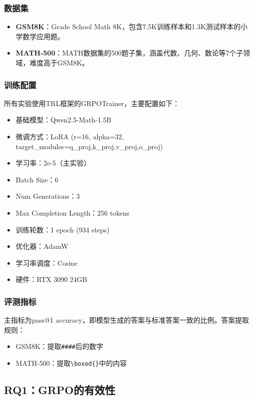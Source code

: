 \documentclass[10.5pt]{article}
\begin{document}
\subsubsection{数据集}

\begin{itemize}[leftmargin=2em]
  \item \textbf{GSM8K}\cite{gsm8k}：Grade School Math 8K，包含7.5K训练样本和1.3K测试样本的小学数学应用题。
  \item \textbf{MATH-500}：MATH数据集的500题子集，涵盖代数、几何、数论等7个子领域，难度高于GSM8K。
\end{itemize}

\subsubsection{训练配置}

所有实验使用TRL框架的GRPOTrainer，主要配置如下：

\begin{itemize}[leftmargin=2em]
  \item 基础模型：Qwen2.5-Math-1.5B
  \item 微调方式：LoRA (r=16, alpha=32, target\_modules=q\_proj,k\_proj,v\_proj,o\_proj)
  \item 学习率：2e-5（主实验）
  \item Batch Size：6
  \item Num Generations：3
  \item Max Completion Length：256 tokens
  \item 训练轮数：1 epoch (934 steps)
  \item 优化器：AdamW
  \item 学习率调度：Cosine
  \item 硬件：RTX 3090 24GB
\end{itemize}

\subsubsection{评测指标}

主指标为pass@1 accuracy，即模型生成的答案与标准答案一致的比例。答案提取规则：
\begin{itemize}[leftmargin=2em]
  \item GSM8K：提取\texttt{\#\#\#\#}后的数字
  \item MATH-500：提取\texttt{\textbackslash boxed\{\}}中的内容
\end{itemize}

\subsection{RQ1：GRPO的有效性}
\end{document}
